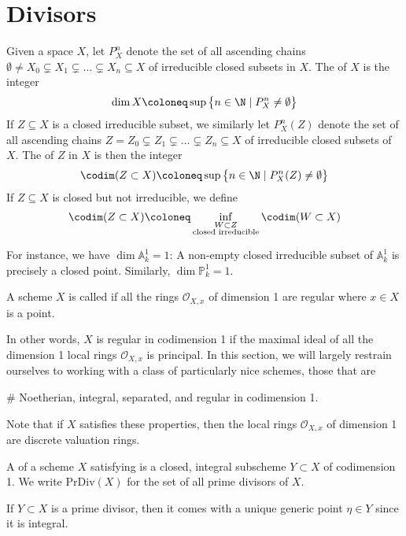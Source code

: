 \documentclass[wip, algebra]{bsteffan-lecturenotes}
\newcommand{\cO}{\mathcal{O}}
\newcommand{\A}{\mathbb{A}}
\renewcommand{\P}{\mathbb{P}}
\newcommand{\PrDiv}{\mathrm{PrDiv}}
\begin{document}
\section{Divisors}
\begin{definition}
	Given a space $X$, let $P_X^n$ denote the set of all ascending chains $\emptyset \neq X_0 \subsetneq X_1 \subsetneq \ldots \subsetneq X_n \subseteq X$ of irreducible closed subsets in $X$.  
	The  of $X$ is the integer
	\begin{equation*}
		\dim X \coloneq \sup \big\{n \in \N \mid P^n_X \neq \emptyset\big\}
	\end{equation*}
	If $Z \subseteq X$ is a closed irreducible subset, we similarly let $P_X^n(Z)$ denote the set of all ascending chains $Z = Z_0 \subsetneq Z_1 \subsetneq \ldots \subsetneq Z_n \subseteq X$ of irreducible closed subsets of $X$.
	The  of $Z$ in $X$ is then the integer
	\begin{equation*}
		\codim(Z \subset X) \coloneq \sup \big\{n \in \N \mid P^n_X(Z) \neq \emptyset\big\}
	\end{equation*}
	If $Z \subseteq X$ is closed but not irreducible, we define
	\begin{equation*}
		\codim(Z \subset X) \coloneq \inf_{\substack{W \subset Z \\ \text{closed irreducible}}} \codim(W \subset X)
	\end{equation*}
\end{definition}
For instance, we have $\dim \A^1_k = 1$: A non-empty closed irreducible subset of $\A^1_k$ is precisely a closed point.
Similarly, $\dim \P^1_k = 1$.
\begin{definition}
	A scheme $X$ is called  if all the rings $\cO_{X, x}$ of dimension 1 are regular where $x \in X$ is a point.
\end{definition}
In other words, $X$ is regular in codimension 1 if the maximal ideal of all the dimension 1 local rings $\cO_{X, x}$ is principal.
In this section, we will largely restrain ourselves to working with a class of particularly nice schemes, those that are\textellipsis{}
\begin{alphanumerate}
	\item[\#]\label{ass:divs:standard} Noetherian, integral, separated, and regular in codimension 1.
\end{alphanumerate}
Note that if $X$ satisfies these properties, then the local rings $\cO_{X, x}$ of dimension 1 are discrete valuation rings.
\begin{definition}
	A  of a scheme $X$ satisfying  is a closed, integral subscheme $Y \subset X$ of codimension 1.
	We write $\PrDiv(X)$ for the set of all prime divisors of $X$.
\end{definition}
If $Y \subset X$ is a prime divisor, then it comes with a unique generic point $\eta \in Y$ since it is integral.
\end{document}
